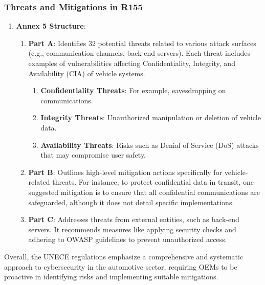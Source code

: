 \subsubsection{Threats and Mitigations in R155}\label{subsubsec:threats-and-mitigations-in-r155}
\begin{enumerate}
    \item \textbf{Annex 5 Structure}:
    \begin{enumerate}
        \item \textbf{Part A}: Identifies 32 potential threats related to various attack surfaces (e.g., communication channels, back-end servers).
        Each threat includes examples of vulnerabilities affecting Confidentiality, Integrity, and Availability (CIA) of vehicle systems.
        \begin{enumerate}
            \item \textbf{Confidentiality Threats}: For example, eavesdropping on communications.
            \item \textbf{Integrity Threats}: Unauthorized manipulation or deletion of vehicle data.
            \item \textbf{Availability Threats}: Risks such as Denial of Service (DoS) attacks that may compromise user safety.
        \end{enumerate}

        \item \textbf{Part B}: Outlines high-level mitigation actions specifically for vehicle-related threats.
        For instance, to protect confidential data in transit, one suggested mitigation is to ensure that all confidential communications are safeguarded, although it does not detail specific implementations.

        \item \textbf{Part C}: Addresses threats from external entities, such as back-end servers.
        It recommends measures like applying security checks and adhering to OWASP guidelines to prevent unauthorized access.
    \end{enumerate}
\end{enumerate}

Overall, the UNECE regulations emphasize a comprehensive and systematic approach to cybersecurity in the automotive sector, requiring OEMs to be proactive in identifying risks and implementing suitable mitigations.


